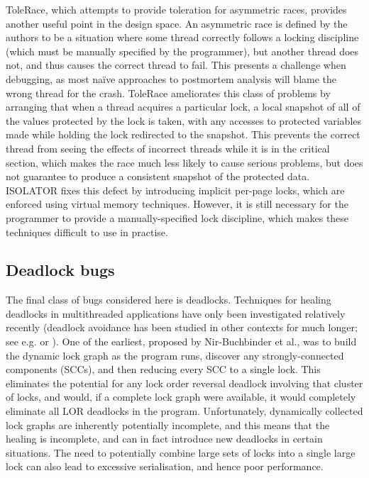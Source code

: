 ToleRace\cite{Kirovski2007}, which attempts to provide toleration for
asymmetric races, provides another useful point in the design space.
An asymmetric race is defined by the authors to be a situation where
some thread correctly follows a locking discipline (which must be
manually specified by the programmer), but another thread does not,
and thus causes the correct thread to fail.  This presents a challenge
when debugging, as most na\"{i}ve approaches to postmortem analysis
will blame the wrong thread for the crash.  ToleRace ameliorates this
class of problems by arranging that when a thread acquires a
particular lock, a local snapshot of all of the values protected by
the lock is taken, with any accesses to protected variables made while
holding the lock redirected to the snapshot.  This prevents the
correct thread from seeing the effects of incorrect threads while it
is in the critical section, which makes the race much less likely to
cause serious problems, but does not guarantee to produce a consistent
snapshot of the protected data.  ISOLATOR\cite{Ramalingam2009} fixes
this defect by introducing implicit per-page locks, which are enforced
using virtual memory techniques.  However, it is still necessary for
the programmer to provide a manually-specified lock discipline, which
makes these techniques difficult to use in practise.


\subsection{Deadlock bugs}
The final class of bugs considered here is deadlocks.  Techniques for
healing deadlocks in multithreaded applications have only been
investigated relatively recently (deadlock avoidance has been studied
in other contexts for much longer; see e.g. \cite{Viswanadham1990} or
\cite{Dijkstra2004}).  One of the earliest, proposed by Nir-Buchbinder
et al.\cite{Nir-Buchbinder2008}, was to build the dynamic lock graph
as the program runs, discover any strongly-connected components
(SCCs), and then reducing every SCC to a single lock.  This eliminates
the potential for any lock order reversal deadlock involving that
cluster of locks, and would, if a complete lock graph were available,
it would completely eliminate all LOR deadlocks in the program.
Unfortunately, dynamically collected lock graphs are inherently
potentially incomplete, and this means that the healing is incomplete,
and can in fact introduce new deadlocks in certain situations.  The
need to potentially combine large sets of locks into a single large
lock can also lead to excessive serialisation, and hence poor
performance.

